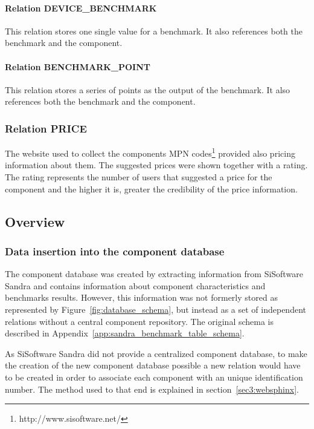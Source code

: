         \paragraph*{Relation DEVICE\_BENCHMARK}
            This relation stores one single value for a benchmark. It also references both the benchmark and the component.
            
        \paragraph*{Relation BENCHMARK\_POINT}
            This relation stores a series of points as the output of the benchmark. It also references both the benchmark and the component.            

    \subsubsection*{Relation PRICE}
        The website used to collect the components MPN codes\footnote{http://www.sisoftware.net/} provided also pricing information about them. The suggested prices were shown together with a rating. The rating represents the number of users that suggested a price for the component and the higher it is, greater the credibility of the price information.
                        
\subsection{Overview} \label{sec4:analysis_overview}
    \subsubsection*{Data insertion into the component database}
        The component database was created by extracting information from SiSoftware Sandra and contains information about component characteristics and benchmarks results. However, this information was not formerly stored as represented by Figure~\ref{fig:database_schema}, but instead as a set of independent relations without a central component repository. The original schema is described in Appendix~\ref{app:sandra_benchmark_table_schema}.
    
        As SiSoftware Sandra did not provide a centralized component database, to make the creation of the new component database possible a new relation would have to be created in order to associate each component with an unique identification number. The method used to that end is explained in section~\ref{sec3:websphinx}.
    

